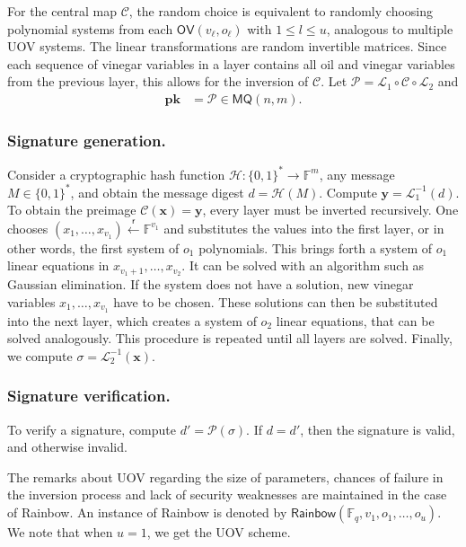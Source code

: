 \documentclass[draft, 12pt, a4paper, oneside]{memoir}
\newcommand{\random}{\overset{\mathsf{r}}{\gets}}
\theoremstyle{definition}
\begin{document}
For the central map $\mathcal{C}$, the random choice is equivalent to randomly choosing polynomial systems from each $\mathsf{OV}(v_{\ell}, o_{\ell})$ with $1 \leq l \leq u$, analogous to multiple UOV systems. The linear transformations are random invertible matrices. Since each sequence of vinegar variables in a layer contains all oil and vinegar variables from the previous layer, this allows for the inversion of $\mathcal{C}$. Let $\mathcal{P} = \mathcal{L}_{1} \circ \mathcal{C} \circ \mathcal{L}_{2}$ and
\begin{align}
  \mathbf{pk} &= \mathcal{P} \in \mathsf{MQ}(n, m).
\end{align}

\subsubsection{Signature generation.}

Consider a cryptographic hash function $\mathcal{H} : \{0, 1\}^{*} \to \mathbb{F}^{m}$, any message $M \in \{0, 1\}^{*}$, and obtain the message digest $d = \mathcal{H}(M)$. Compute $\mathbf{y} = \mathcal{L}_{1}^{-1}(d)$. To obtain the preimage $\mathcal{C}(\mathbf{x}) = \mathbf{y}$, every layer must be inverted recursively. One chooses $(x_{1}, \dots, x_{v_{1}}) \random \mathbb{F}^{v_{1}}$ and substitutes the values into the first layer, or in other words, the first system of $o_{1}$ polynomials. This brings forth a system of $o_{1}$ linear equations in $x_{v_{1} + 1}, \dots, x_{v_{2}}$. It can be solved with an algorithm such as Gaussian elimination. If the system does not have a solution, new vinegar variables $x_{1}, \dots, x_{v_{1}}$ have to be chosen. These solutions can then be substituted into the next layer, which creates a system of $o_{2}$ linear equations, that can be solved analogously. This procedure is repeated until all layers are solved. Finally, we compute $\sigma = \mathcal{L}_{2}^{-1}(\mathbf{x})$.

\subsubsection{Signature verification.}

To verify a signature, compute $d' = \mathcal{P}(\sigma)$. If $d = d'$, then
the signature is valid, and otherwise invalid.

The remarks about UOV regarding the size of parameters, chances of failure in the inversion process and lack of security weaknesses are maintained in the case of Rainbow. An instance of Rainbow is denoted by $\mathsf{Rainbow}(\mathbb{F}_{q}, v_{1}, o_{1}, \dots, o_{u})$. We note that when $u = 1$, we get the UOV scheme.
\end{document}
